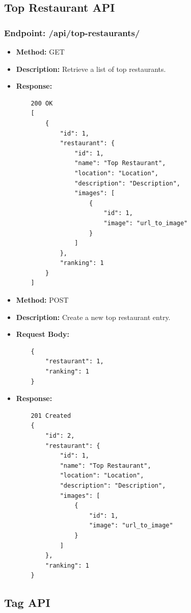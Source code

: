 \subsection{Top Restaurant API}

\subsubsection{Endpoint: /api/top-restaurants/}
\begin{itemize}
    \item \textbf{Method:} GET
    \item \textbf{Description:} Retrieve a list of top restaurants.
    \item \textbf{Response:}
    \begin{verbatim}
    200 OK
    [
        {
            "id": 1,
            "restaurant": {
                "id": 1,
                "name": "Top Restaurant",
                "location": "Location",
                "description": "Description",
                "images": [
                    {
                        "id": 1,
                        "image": "url_to_image"
                    }
                ]
            },
            "ranking": 1
        }
    ]
    \end{verbatim}
    \item \textbf{Method:} POST
    \item \textbf{Description:} Create a new top restaurant entry.
    \item \textbf{Request Body:}
    \begin{verbatim}
    {
        "restaurant": 1,
        "ranking": 1
    }
    \end{verbatim}
    \item \textbf{Response:}
    \begin{verbatim}
    201 Created
    {
        "id": 2,
        "restaurant": {
            "id": 1,
            "name": "Top Restaurant",
            "location": "Location",
            "description": "Description",
            "images": [
                {
                    "id": 1,
                    "image": "url_to_image"
                }
            ]
        },
        "ranking": 1
    }
    \end{verbatim}
\end{itemize}


\subsection{Tag API}

